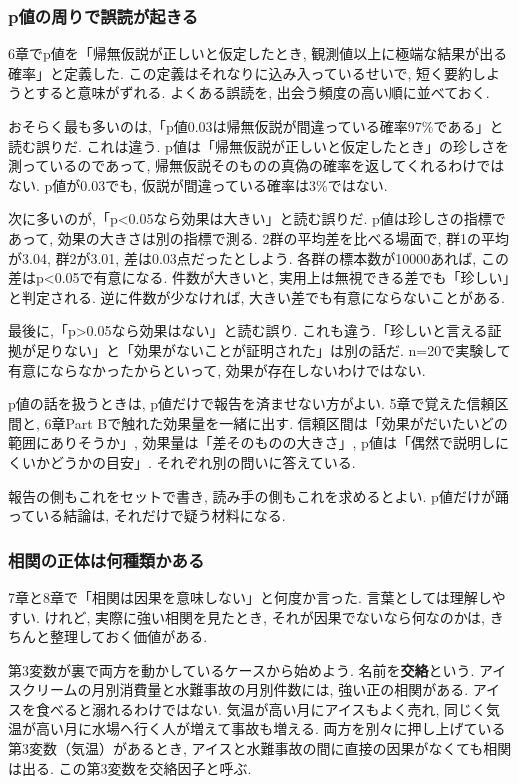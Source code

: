 \subsubsection*{p値の周りで誤読が起きる}

6章でp値を「帰無仮説が正しいと仮定したとき, 観測値以上に極端な結果が出る確率」と定義した.
この定義はそれなりに込み入っているせいで, 短く要約しようとすると意味がずれる.
よくある誤読を, 出会う頻度の高い順に並べておく.

おそらく最も多いのは,「p値0.03は帰無仮説が間違っている確率97\%である」と読む誤りだ.
これは違う. p値は「帰無仮説が正しいと仮定したとき」の珍しさを測っているのであって, 帰無仮説そのものの真偽の確率を返してくれるわけではない.
p値が0.03でも, 仮説が間違っている確率は3\%ではない.

次に多いのが,「p<0.05なら効果は大きい」と読む誤りだ.
p値は珍しさの指標であって, 効果の大きさは別の指標で測る.
2群の平均差を比べる場面で, 群1の平均が3.04, 群2が3.01, 差は0.03点だったとしよう.
各群の標本数が10000あれば, この差はp<0.05で有意になる.
件数が大きいと, 実用上は無視できる差でも「珍しい」と判定される.
逆に件数が少なければ, 大きい差でも有意にならないことがある.

最後に,「p>0.05なら効果はない」と読む誤り.
これも違う.「珍しいと言える証拠が足りない」と「効果がないことが証明された」は別の話だ.
n=20で実験して有意にならなかったからといって, 効果が存在しないわけではない.

p値の話を扱うときは, p値だけで報告を済ませない方がよい.
5章で覚えた信頼区間と, 6章Part Bで触れた効果量を一緒に出す.
信頼区間は「効果がだいたいどの範囲にありそうか」, 効果量は「差そのものの大きさ」, p値は「偶然で説明しにくいかどうかの目安」.
それぞれ別の問いに答えている.

報告の側もこれをセットで書き, 読み手の側もこれを求めるとよい.
p値だけが踊っている結論は, それだけで疑う材料になる.

\subsubsection*{相関の正体は何種類かある}

7章と8章で「相関は因果を意味しない」と何度か言った.
言葉としては理解しやすい. けれど, 実際に強い相関を見たとき, それが因果でないなら何なのかは, きちんと整理しておく価値がある.

第3変数が裏で両方を動かしているケースから始めよう. 名前を\textbf{交絡}という.
アイスクリームの月別消費量と水難事故の月別件数には, 強い正の相関がある.
アイスを食べると溺れるわけではない. 気温が高い月にアイスもよく売れ, 同じく気温が高い月に水場へ行く人が増えて事故も増える.
両方を別々に押し上げている第3変数（気温）があるとき, アイスと水難事故の間に直接の因果がなくても相関は出る.
この第3変数を交絡因子と呼ぶ.

